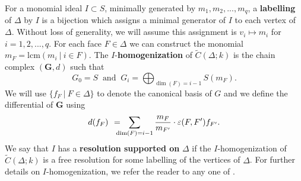 \documentclass[12pt,leqno]{amsart}
\theoremstyle{definition}
\begin{document}
For a monomial ideal $I \subset S$, minimally generated by $m_1,m_2,...,m_q$, a \textbf{labelling} of $\Delta$ by $I$ is a bijection which assigns a minimal generator of $I$ to each vertex of $\Delta$. Without loss of generality, we will assume this assignment is $v_i \longmapsto m_i$ for $i = 1,2,...,q$. For each face $F \in \Delta$ we can construct the monomial $m_F = \mathrm{lcm}(m_i \ | \ i \in F )$. The $I$-\textbf{homogenization} of $\widetilde{C} (\Delta;k)$ is the chain complex $(\mathbf G, d)$ such that
%
\begin{displaymath}
  G_0 = S \ \text{ and } \ G_i = \bigoplus_{\dim(F) = i-1}S(m_F).
\end{displaymath}
%
We will use $\{f_F \ | \ F \in \Delta \}$ to denote the canonical basis of $G$ and we define the differential of $\mathbf G$ using
%
\begin{displaymath}
  d(f_F) \hspace{4pt} = \hspace{-8pt} \sum_{\dim(F) = i-1} \frac{m_F}{m_{F'}} \cdot \varepsilon(F,F') f_{F'}.
\end{displaymath}
%
We say that $I$ has a \textbf{resolution supported on} $\Delta$ if the $I$-homogenization of $\widetilde C(\Delta; k)$ is a free resolution for some labelling of the vertices of $\Delta$. For further details on $I$-homogenization, we refer the reader to any one of \cite{BPS, MS, Peeva, PV}.
%
\end{document}
